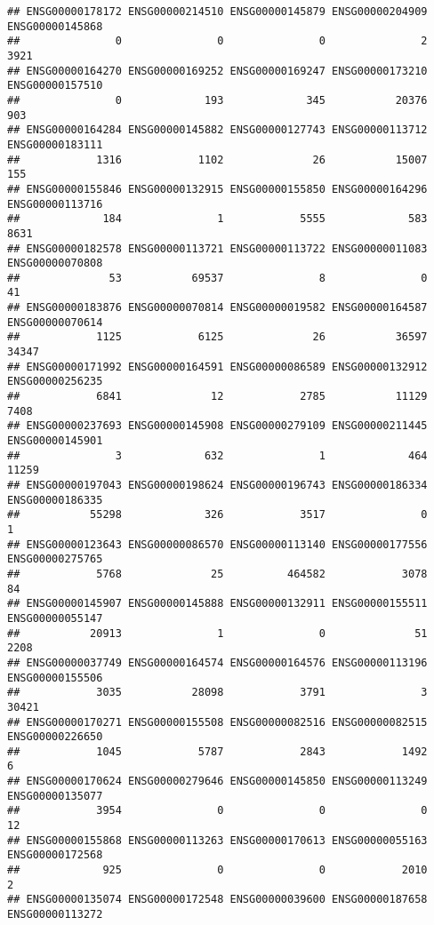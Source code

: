 \documentclass[
]{article}
\begin{document}
\begin{verbatim}
## ENSG00000178172 ENSG00000214510 ENSG00000145879 ENSG00000204909 ENSG00000145868 
##               0               0               0               2            3921 
## ENSG00000164270 ENSG00000169252 ENSG00000169247 ENSG00000173210 ENSG00000157510 
##               0             193             345           20376             903 
## ENSG00000164284 ENSG00000145882 ENSG00000127743 ENSG00000113712 ENSG00000183111 
##            1316            1102              26           15007             155 
## ENSG00000155846 ENSG00000132915 ENSG00000155850 ENSG00000164296 ENSG00000113716 
##             184               1            5555             583            8631 
## ENSG00000182578 ENSG00000113721 ENSG00000113722 ENSG00000011083 ENSG00000070808 
##              53           69537               8               0              41 
## ENSG00000183876 ENSG00000070814 ENSG00000019582 ENSG00000164587 ENSG00000070614 
##            1125            6125              26           36597           34347 
## ENSG00000171992 ENSG00000164591 ENSG00000086589 ENSG00000132912 ENSG00000256235 
##            6841              12            2785           11129            7408 
## ENSG00000237693 ENSG00000145908 ENSG00000279109 ENSG00000211445 ENSG00000145901 
##               3             632               1             464           11259 
## ENSG00000197043 ENSG00000198624 ENSG00000196743 ENSG00000186334 ENSG00000186335 
##           55298             326            3517               0               1 
## ENSG00000123643 ENSG00000086570 ENSG00000113140 ENSG00000177556 ENSG00000275765 
##            5768              25          464582            3078              84 
## ENSG00000145907 ENSG00000145888 ENSG00000132911 ENSG00000155511 ENSG00000055147 
##           20913               1               0              51            2208 
## ENSG00000037749 ENSG00000164574 ENSG00000164576 ENSG00000113196 ENSG00000155506 
##            3035           28098            3791               3           30421 
## ENSG00000170271 ENSG00000155508 ENSG00000082516 ENSG00000082515 ENSG00000226650 
##            1045            5787            2843            1492               6 
## ENSG00000170624 ENSG00000279646 ENSG00000145850 ENSG00000113249 ENSG00000135077 
##            3954               0               0               0              12 
## ENSG00000155868 ENSG00000113263 ENSG00000170613 ENSG00000055163 ENSG00000172568 
##             925               0               0            2010               2 
## ENSG00000135074 ENSG00000172548 ENSG00000039600 ENSG00000187658 ENSG00000113272 

\end{verbatim}
\end{document}
